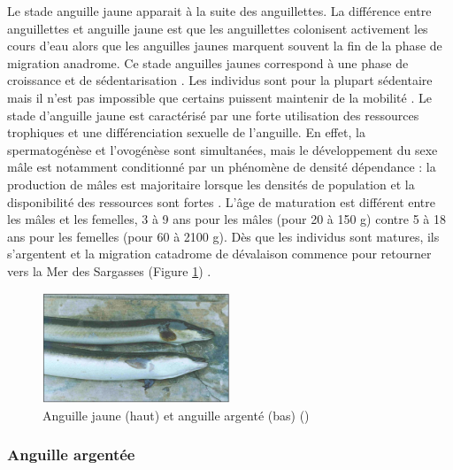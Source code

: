 \documentclass[11pt,titlepage,twoside]{article}\usepackage[]{graphicx}\usepackage[table]{xcolor}
\begin{document}
Le stade anguille jaune apparait à la suite des anguillettes. La différence entre anguillettes et anguille jaune est que les anguillettes colonisent activement les cours d’eau alors que les anguilles jaunes marquent souvent la fin de la phase de migration anadrome. Ce stade anguilles jaunes correspond à une phase de croissance et de sédentarisation \citep{laffaille_point_2005}. Les individus sont pour la plupart sédentaire mais il n’est pas impossible que certains puissent maintenir de la mobilité \citep{laffaille_point_2005}. Le stade d’anguille jaune est caractérisé par une forte utilisation des ressources trophiques et une différenciation sexuelle de l’anguille. En effet, la spermatogénèse et l’ovogénèse sont simultanées, mais le développement du sexe mâle est notamment conditionné par un phénomène de densité dépendance : la production de mâles est majoritaire lorsque les densités de population et la disponibilité des ressources sont fortes \citep{passakas_karyological_1980}. L’âge de maturation est différent entre les mâles et les femelles, 3 à 9 ans pour les mâles (pour 20 à 150 g) contre 5 à 18 ans pour les femelles (pour 60 à 2100 g). Dès que les individus sont matures, ils s’argentent et la migration catadrome de dévalaison commence pour retourner vers la Mer des Sargasses (Figure \ref{ang_jaune_argent}) \citep{feunteun_commercially_2011,oliveira_life_1999}.

\begin{figure}[htpb]
\centering
\includegraphics[width=0.5\textwidth]{ang_jaune_argent}
\caption{Anguille jaune (haut) et anguille argenté (bas) (\citep{durif_migration_2003})}
\label{ang_jaune_argent}
\end{figure}

\subsubsection{Anguille argentée }
\end{document}
